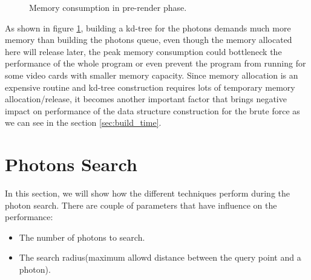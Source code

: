 \begin{figure}[ftp] 
    \centering 
    \renewcommand{\thefigure}{\thechapter.\arabic{figure}}
    \caption[]{Memory consumption in pre-render phase. }
    \label{fig:memory_consumption_2}  
\end{figure}   

As shown in figure \ref{fig:memory_consumption_2}, building a kd-tree for the photons demands much more memory than building the photons queue, even though the memory allocated here will release later, the peak memory consumption could bottleneck the performance of the whole program or even prevent the program from running for some video cards with smaller memory capacity. Since memory allocation is an expensive routine and kd-tree construction requires lots of temporary memory allocation/release, it becomes another important factor that brings negative impact on performance of the data structure construction for the brute force as we can see in the section \ref{sec:build_time}.  

\section{Photons Search}

In this section, we will show how the different techniques perform during the photon search. There are couple of parameters that have influence on the performance: 

\begin{itemize}

\item{The number of photons to search. }

\item{The search radius(maximum allowd distance between the query point and a photon). } 

\end{itemize} 

